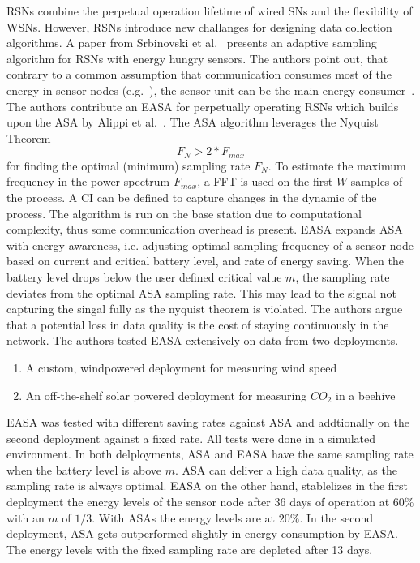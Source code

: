 \acp{RSN} combine the perpetual operation lifetime of wired \acp{SN} and the
flexibility of \acp{WSN}. However, \acp{RSN} introduce new challanges for
designing data collection algorithms. A paper from Srbinovski et
al.~\cite{srbinovski2016energy} presents an adaptive sampling algorithm for
\acp{RSN} with energy hungry sensors. The authors point out, that contrary to a
common assumption that communication consumes most of the energy in sensor
nodes (e.g.~\cite{santini2006adaptive}), the sensor unit can be the main energy
consumer~\cite{boyle2012energy}. The authors contribute an \ac{EASA} for
perpetually operating \acp{RSN} which builds upon the \ac{ASA} by Alippi et
al.~\cite{alippi2007adaptive}. The \ac{ASA} algorithm leverages the Nyquist
Theorem $$ F_N > 2 * F_{max} $$ for finding the optimal (minimum) sampling rate
$ F_N $. To estimate the maximum frequency in the power spectrum $ F_{max} $, a
\ac{FFT} is used on the first $ W $ samples of the process. A \ac{CI} can be
defined to capture changes in the dynamic of the process. The algorithm is run
on the base station due to computational complexity, thus some communication
overhead is present. \ac{EASA} expands \ac{ASA} with energy awareness, i.e.
adjusting optimal sampling frequency of a sensor node based on current and
critical battery level, and rate of energy saving. When the battery level drops
below the user defined critical value $ m $, the sampling rate deviates from the
optimal \ac{ASA} sampling rate. This may lead to the signal not capturing the
singal fully as the nyquist theorem is violated. The authors argue that a
potential loss in data quality is the cost of staying continuously in the
network. The authors tested \ac{EASA} extensively on data from two deployments.

\begin{enumerate}
    \item A custom, windpowered deployment for measuring wind speed
    \item An off-the-shelf solar powered deployment for measuring $ CO_2 $ in a beehive
\end{enumerate}

\ac{EASA} was tested with different saving rates against \ac{ASA} and
addtionally on the second deployment against a fixed rate. All tests were done
in a simulated environment. In both delployments, \ac{ASA} and \ac{EASA} have
the same sampling rate when the battery level is above $ m $. \ac{ASA} can
deliver a high data quality, as the sampling rate is always optimal. \ac{EASA}
on the other hand, stablelizes in the first deployment the energy levels of the
sensor node after 36 days of operation at $ 60\% $ with an $ m $ of $ 1/3 $.
With \acp{ASA} the energy levels are at $ 20\% $. In the second deployment,
\ac{ASA} gets outperformed slightly in energy consumption by \ac{EASA}. The
energy levels with the fixed sampling rate are depleted after 13 days.

